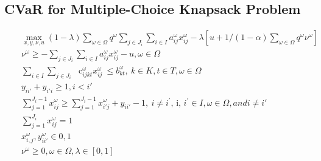 \subsection{CVaR for Multiple-Choice Knapsack Problem}
\label{subsec:CVaR_MCKP}

\vst {}
\begin{subequations}\label{CVaRMCKP}
\begin{eqnarray}
& & \max_{x, y, \nu, u} (1-\lambda)  \sum _{ \omega  \in  \Omega }^{}q^{ \omega } \sum_{j\in J_i} \sum _{i \in I}^{} a_{ij}^{ \omega }x_{ij}^{ \omega } - \lambda[u+1/(1-\alpha)\sum_{\omega \in \Omega} q^\omega \nu^\omega] \\
& & \nu^\omega \ge - \sum_{j\in J_i} \sum _{i \in I}^{} a_{ij}^{ \omega }x_{ij}^{ \omega } - u, \omega \in \Omega \\
& & \sum _{i \in I}^{} \sum _{j \in J_{i}}^{}\text{~ c}_{ijkt}^{ \omega }x_{ij}^{ \omega }~  \leq  b_{kt}^{ \omega },~ k \in K, t \in T,  \omega  \in  \Omega \\
& & y_{ii'} + y_{i'i} \geq 1, i<i'  \\
& & \sum_{j=1}^{J_i - 1} x_{ij}^\omega \geq \sum_{j=1}^{J_i - 1} x_{i'j}^\omega + y_{ii'} -1,~ i \neq i^{'}\text{, i, }i^{'} \in I,  \omega  \in  \Omega, and i \neq i' \\
& & \sum_{j=1}^{J_i} x_{ij}^\omega = 1 \\
& & x_{i,j}^\omega, y_{ii'}^\omega \in {0, 1} \\
& & \nu^\omega \ge 0, \omega \in \Omega, \lambda \in [0, 1]
\end{eqnarray}
\end{subequations}

